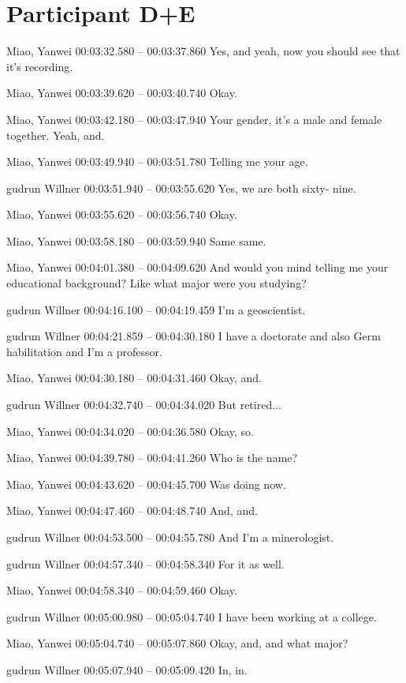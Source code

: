 \section*{Participant D+E}

{\parindent0pt
\tiny
\singlespacing
Miao, Yanwei 00:03:32.580 -- 00:03:37.860
Yes, and yeah, now you should see that it's recording.

Miao, Yanwei 00:03:39.620 -- 00:03:40.740
Okay.

Miao, Yanwei 00:03:42.180 -- 00:03:47.940
Your gender, it's a male and female together. Yeah, and.

Miao, Yanwei 00:03:49.940 -- 00:03:51.780
Telling me your age.

gudrun Willner 00:03:51.940 -- 00:03:55.620
Yes, we are both sixty- nine.

Miao, Yanwei 00:03:55.620 -- 00:03:56.740
Okay.

Miao, Yanwei 00:03:58.180 -- 00:03:59.940
Same same.

Miao, Yanwei 00:04:01.380 -- 00:04:09.620
And would you mind telling me your educational background? Like what major were you studying?

gudrun Willner 00:04:16.100 -- 00:04:19.459
I'm a geoscientist.

gudrun Willner 00:04:21.859 -- 00:04:30.180
I have a doctorate and also Germ habilitation and I'm a professor.

Miao, Yanwei 00:04:30.180 -- 00:04:31.460
Okay, and.

gudrun Willner 00:04:32.740 -- 00:04:34.020
But retired...

Miao, Yanwei 00:04:34.020 -- 00:04:36.580
Okay, so.

Miao, Yanwei 00:04:39.780 -- 00:04:41.260
Who is the name?

Miao, Yanwei 00:04:43.620 -- 00:04:45.700
Was doing now.

Miao, Yanwei 00:04:47.460 -- 00:04:48.740
And, and.

gudrun Willner 00:04:53.500 -- 00:04:55.780
And I'm a minerologist.

gudrun Willner 00:04:57.340 -- 00:04:58.340
For it as well.

Miao, Yanwei 00:04:58.340 -- 00:04:59.460
Okay.

gudrun Willner 00:05:00.980 -- 00:05:04.740
I have been working at a college.

Miao, Yanwei 00:05:04.740 -- 00:05:07.860
Okay, and, and what major?

gudrun Willner 00:05:07.940 -- 00:05:09.420
In, in.

}
